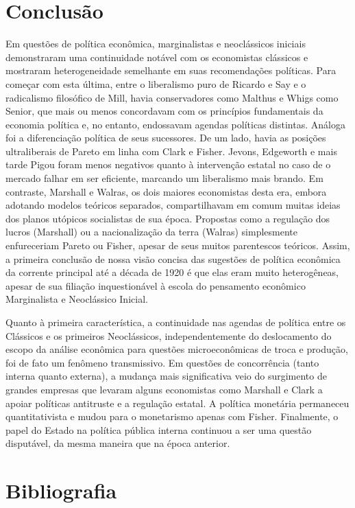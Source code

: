 \documentclass[12pt]{article}
\begin{document}
\section*{Conclusão}

Em questões de política econômica, marginalistas e neoclássicos iniciais demonstraram uma continuidade notável com os economistas clássicos e mostraram heterogeneidade semelhante em suas recomendações políticas. Para começar com esta última, entre o liberalismo puro de Ricardo e Say e o radicalismo filosófico de Mill, havia conservadores como Malthus e Whigs como Senior, que mais ou menos concordavam com os princípios fundamentais da economia política e, no entanto, endossavam agendas políticas distintas. Análoga foi a diferenciação política de seus sucessores. De um lado, havia as posições ultraliberais de Pareto em linha com Clark e Fisher. Jevons, Edgeworth e mais tarde Pigou foram menos negativos quanto à intervenção estatal no caso de o mercado falhar em ser eficiente, marcando um liberalismo mais brando. Em contraste, Marshall e Walras, os dois maiores economistas desta era, embora adotando modelos teóricos separados, compartilhavam em comum muitas ideias dos planos utópicos socialistas de sua época. Propostas como a regulação dos lucros (Marshall) ou a nacionalização da terra (Walras) simplesmente enfureceriam Pareto ou Fisher, apesar de seus muitos parentescos teóricos. Assim, a primeira conclusão de nossa visão concisa das sugestões de política econômica da corrente principal até a década de 1920 é que elas eram muito heterogêneas, apesar de sua filiação inquestionável à escola do pensamento econômico Marginalista e Neoclássico Inicial.

Quanto à primeira característica, a continuidade nas agendas de política entre os Clássicos e os primeiros Neoclássicos, independentemente do deslocamento do escopo da análise econômica para questões microeconômicas de troca e produção, foi de fato um fenômeno transmissivo. Em questões de concorrência (tanto interna quanto externa), a mudança mais significativa veio do surgimento de grandes empresas que levaram alguns economistas como Marshall e Clark a apoiar políticas antitruste e a regulação estatal. A política monetária permaneceu quantitativista e mudou para o monetarismo apenas com Fisher. Finalmente, o papel do Estado na política pública interna continuou a ser uma questão disputável, da mesma maneira que na época anterior.

\section*{Bibliografia}
\end{document}
